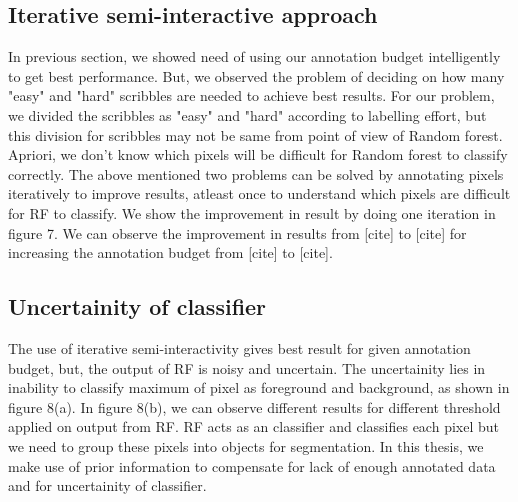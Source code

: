 \subsection{Iterative semi-interactive approach}
In previous section, we showed need of using our annotation budget intelligently to get best performance. But, we observed the problem of deciding on how many "easy" and "hard" scribbles are needed to achieve best results. For our problem, we divided the scribbles as "easy" and "hard" according to labelling effort, but this division for scribbles may not be same from point of view of Random forest. Apriori, we don't know which pixels will be difficult for Random forest to classify correctly. The above mentioned two problems can be solved by annotating pixels iteratively to improve results, atleast once to understand which pixels are difficult for RF to classify. We show the improvement in result by doing one iteration in figure 7. We can observe the improvement in results from [cite] to [cite] for increasing the annotation budget from [cite] to [cite]. \par

\subsection{Uncertainity of classifier}
The use of iterative semi-interactivity gives best result for given annotation budget, but, the output of RF is noisy and uncertain. The uncertainity lies in inability to classify maximum of pixel as foreground and background, as shown in figure 8(a). In figure 8(b), we can observe different results for different threshold applied on output from RF. RF acts as an classifier and classifies each pixel but we need to group these pixels into objects for segmentation. In this thesis, we make use of prior information to compensate for lack of enough annotated data and for uncertainity of classifier.

